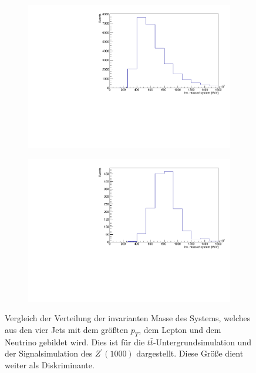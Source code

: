 \begin{figure}
  \begin{subfigure}{0.5\textwidth}
    \centering
    \includegraphics[width=\linewidth]{plots_and_txt/ttbar.mu_selected_/ttbar.mu_selected_SysJetMass.pdf}
    \caption{}
    \label{fig:ttbar_sys}
  \end{subfigure}%
  \begin{subfigure}{0.5\textwidth}
    \centering
    \includegraphics[width=\linewidth]{plots_and_txt/zprime1000.mu_selected_/zprime1000.mu_selected_SysJetMass.pdf}
    \caption{}
    \label{fig:zprime_sys}
  \end{subfigure}%
  \caption{Vergleich der Verteilung der invarianten Masse des Systems, welches aus den vier Jets mit dem größten $p_T$, dem Lepton und dem Neutrino gebildet wird.
  Dies ist für die $t\bar{t}$-Untergrundsimulation  und der Signalsimulation des $Z^\prime(1000)$  dargestellt.
  Diese Größe dient weiter als Diskriminante.
  }
  \label{fig:Comparison}
\end{figure}













